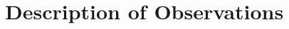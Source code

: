 \documentclass[12pt,a4paper]{article}  %
\begin{document}



%
%
 

%




\vspace{-1em}
\section{Description of Observations}\label{sec:desc_obs}
\end{document}
